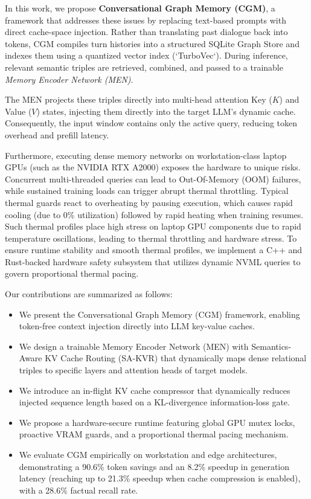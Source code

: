 \documentclass[conference]{IEEEtran}
\begin{document}
In this work, we propose \textbf{Conversational Graph Memory (CGM)}, a framework that addresses these issues by replacing text-based prompts with direct cache-space injection. Rather than translating past dialogue back into tokens, CGM compiles turn histories into a structured SQLite Graph Store and indexes them using a quantized vector index (`TurboVec`). During inference, relevant semantic triples are retrieved, combined, and passed to a trainable \textit{Memory Encoder Network (MEN)}. 

The MEN projects these triples directly into multi-head attention Key ($K$) and Value ($V$) states, injecting them directly into the target LLM's dynamic cache. Consequently, the input window contains only the active query, reducing token overhead and prefill latency.

Furthermore, executing dense memory networks on workstation-class laptop GPUs (such as the NVIDIA RTX A2000) exposes the hardware to unique risks. Concurrent multi-threaded queries can lead to Out-Of-Memory (OOM) failures, while sustained training loads can trigger abrupt thermal throttling. Typical thermal guards react to overheating by pausing execution, which causes rapid cooling (due to 0\% utilization) followed by rapid heating when training resumes. Such thermal profiles place high stress on laptop GPU components due to rapid temperature oscillations, leading to thermal throttling and hardware stress. To ensure runtime stability and smooth thermal profiles, we implement a C++ and Rust-backed hardware safety subsystem that utilizes dynamic NVML queries to govern proportional thermal pacing.

Our contributions are summarized as follows:
\begin{itemize}
    \item We present the Conversational Graph Memory (CGM) framework, enabling token-free context injection directly into LLM key-value caches.
    \item We design a trainable Memory Encoder Network (MEN) with Semantics-Aware KV Cache Routing (SA-KVR) that dynamically maps dense relational triples to specific layers and attention heads of target models.
    \item We introduce an in-flight KV cache compressor that dynamically reduces injected sequence length based on a KL-divergence information-loss gate.
    \item We propose a hardware-secure runtime featuring global GPU mutex locks, proactive VRAM guards, and a proportional thermal pacing mechanism.
    \item We evaluate CGM empirically on workstation and edge architectures, demonstrating a 90.6\% token savings and an 8.2\% speedup in generation latency (reaching up to 21.3\% speedup when cache compression is enabled), with a 28.6\% factual recall rate.
\end{itemize}
\end{document}
